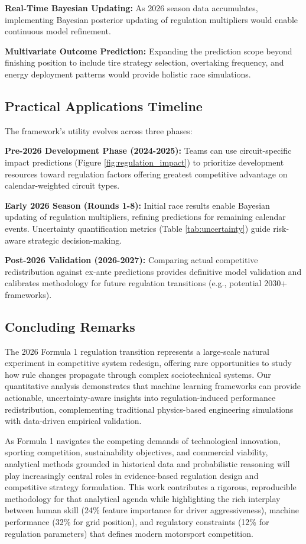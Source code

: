 \documentclass[conference]{IEEEtran}
\begin{document}
\textbf{Real-Time Bayesian Updating:} As 2026 season data accumulates, implementing Bayesian posterior updating of regulation multipliers would enable continuous model refinement.

\textbf{Multivariate Outcome Prediction:} Expanding the prediction scope beyond finishing position to include tire strategy selection, overtaking frequency, and energy deployment patterns would provide holistic race simulations.

\subsection{Practical Applications Timeline}

The framework's utility evolves across three phases:

\textbf{Pre-2026 Development Phase (2024-2025):} Teams can use circuit-specific impact predictions (Figure \ref{fig:regulation_impact}) to prioritize development resources toward regulation factors offering greatest competitive advantage on calendar-weighted circuit types.

\textbf{Early 2026 Season (Rounds 1-8):} Initial race results enable Bayesian updating of regulation multipliers, refining predictions for remaining calendar events. Uncertainty quantification metrics (Table \ref{tab:uncertainty}) guide risk-aware strategic decision-making.

\textbf{Post-2026 Validation (2026-2027):} Comparing actual competitive redistribution against ex-ante predictions provides definitive model validation and calibrates methodology for future regulation transitions (e.g., potential 2030+ frameworks).

\subsection{Concluding Remarks}

The 2026 Formula 1 regulation transition represents a large-scale natural experiment in competitive system redesign, offering rare opportunities to study how rule changes propagate through complex sociotechnical systems. Our quantitative analysis demonstrates that machine learning frameworks can provide actionable, uncertainty-aware insights into regulation-induced performance redistribution, complementing traditional physics-based engineering simulations with data-driven empirical validation.

As Formula 1 navigates the competing demands of technological innovation, sporting competition, sustainability objectives, and commercial viability, analytical methods grounded in historical data and probabilistic reasoning will play increasingly central roles in evidence-based regulation design and competitive strategy formulation. This work contributes a rigorous, reproducible methodology for that analytical agenda while highlighting the rich interplay between human skill (24\% feature importance for driver aggressiveness), machine performance (32\% for grid position), and regulatory constraints (12\% for regulation parameters) that defines modern motorsport competition.
\end{document}
